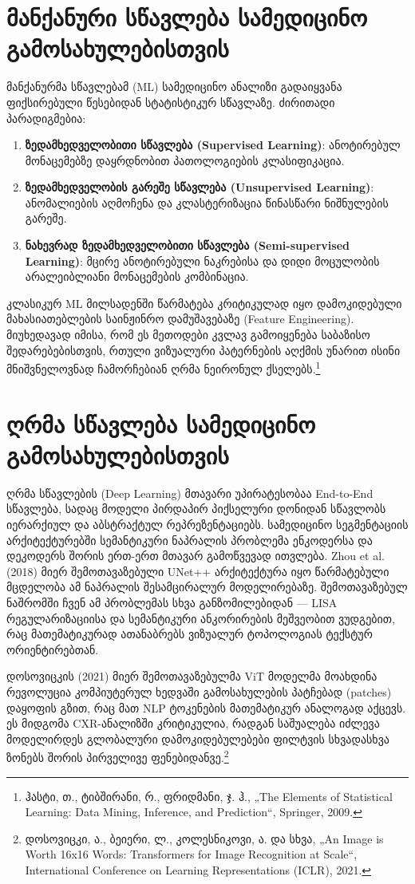 \documentclass[12pt,a4paper,oneside]{report}
\begin{document}
\section{მანქანური სწავლება სამედიცინო გამოსახულებისთვის}
მანქანურმა სწავლებამ (ML) სამედიცინო ანალიზი გადაიყვანა ფიქსირებული წესებიდან სტატისტიკურ სწავლაზე. ძირითადი პარადიგმებია:
\begin{enumerate}[leftmargin=1.6em]
    \item \textbf{ზედამხედველობითი სწავლება (Supervised Learning)}: ანოტირებულ მონაცემებზე დაყრდნობით პათოლოგიების კლასიფიკაცია.
    \item \textbf{ზედამხედველობის გარეშე სწავლება (Unsupervised Learning)}: ანომალიების აღმოჩენა და კლასტერიზაცია წინასწარი ნიშნულების გარეშე.
    \item \textbf{ნახევრად ზედამხედველობითი სწავლება (Semi-supervised Learning)}: მცირე ანოტირებული ნაკრებისა და დიდი მოცულობის არალეიბლიანი მონაცემების კომბინაცია.
\end{enumerate}

კლასიკურ ML მილსადენში წარმატება კრიტიკულად იყო დამოკიდებული მახასიათებლების საინჟინრო დამუშავებაზე (Feature Engineering). მიუხედავად იმისა, რომ ეს მეთოდები კვლავ გამოიყენება საბაზისო შედარებებისთვის, რთული ვიზუალური პატერნების აღქმის უნარით ისინი მნიშვნელოვნად ჩამორჩებიან ღრმა ნეირონულ ქსელებს.\footnote{ჰასტი, თ., ტიბშირანი, რ., ფრიდმანი, ჯ. ჰ., „The Elements of Statistical Learning: Data Mining, Inference, and Prediction“, Springer, 2009.}

\section{ღრმა სწავლება სამედიცინო გამოსახულებისთვის}
ღრმა სწავლების (Deep Learning) მთავარი უპირატესობაა End-to-End სწავლება, სადაც მოდელი პირდაპირ პიქსელური დონიდან სწავლობს იერარქიულ და აბსტრაქტულ რეპრეზენტაციებს. სამედიცინო სეგმენტაციის არქიტექტურებში სემანტიკური ნაპრალის პრობლემა ენკოდერსა და დეკოდერს შორის ერთ-ერთ მთავარ გამოწვევად ითვლება. Zhou et al. (2018) მიერ შემოთავაზებული UNet++ არქიტექტურა იყო წარმატებული მცდელობა ამ ნაპრალის შესამცირალურ მოდელირებაზე. შემოთავაზებულ ნაშრომში ჩვენ ამ პრობლემას სხვა განზომილებიდან — LISA რეგულარიზაციისა და სემანტიკური ანკორირების მეშვეობით ვუდგებით, რაც მათემატიკურად ათანაბრებს ვიზუალურ ტოპოლოგიას ტექსტურ ორიენტირებთან.

დოსოვიცკის (2021) მიერ შემოთავაზებულმა ViT მოდელმა მოახდინა რევოლუცია კომპიუტერულ ხედვაში გამოსახულების პატჩებად (patches) დაყოფის გზით, რაც მათ NLP ტოკენების მათემატიკურ ანალოგად აქცევს. ეს მიდგომა CXR-ანალიზში კრიტიკულია, რადგან საშუალება იძლევა მოდელირდეს გლობალური დამოკიდებულებები ფილტვის სხვადასხვა ზონებს შორის პირველივე ფენებიდანვე.\footnote{დოსოვიცკი, ა., ბეიერი, ლ., კოლესნიკოვი, ა. და სხვა, „An Image is Worth 16x16 Words: Transformers for Image Recognition at Scale“, International Conference on Learning Representations (ICLR), 2021.}
\end{document}
